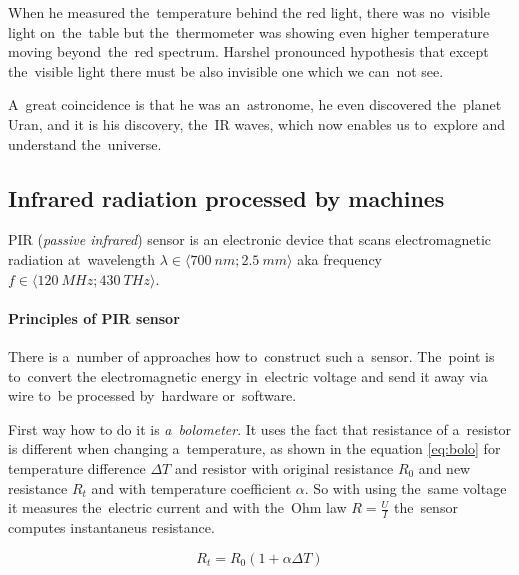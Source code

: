 When he measured the~temperature behind the red light, there was no~visible light on~the~table but
the~thermometer was showing even higher temperature moving beyond~the~red spectrum. Harshel
pronounced hypothesis that except the~visible light there must be also invisible one which we can~not
see. \cite{HerschelLife}


A~great coincidence is that he was an~astronome, he even discovered the~planet Uran, and it is his discovery,
the~IR waves, which now enables us to~explore and understand the~universe. \cite{NasaIrVideo}



\subsection*{Infrared radiation processed by machines}
\label{IRsensing}
PIR ({\it passive infrared}) sensor is an electronic device that scans electromagnetic
radiation at~wavelength $\lambda\in \langle 700~nm;2.5~mm \rangle$ aka frequency $f\in \langle 120~MHz;430~THz \rangle$. \cite{an2105}

\paragraph{Principles of PIR sensor}
There is a~number of approaches how to~construct such a~sensor. The~point is to~convert the electromagnetic
energy in~electric voltage and send it away via wire to~be processed by~hardware or~software.

First way how to do it is {\it a~bolometer}. It uses the fact that resistance of a~resistor is different
when changing a~temperature, as shown in the equation \ref{eq:bolo} for temperature difference $\Delta T$
and resistor with original resistance $R_0$ and new resistance $R_t$ and with temperature coefficient $\alpha$.
So with using the~same voltage it measures the~electric current and with the~Ohm law $R = \frac{U}{I}$
the~sensor computes instantaneus resistance.

\begin{equation}
\label{eq:bolo}
R_t = R_0 (1 + \alpha\Delta T)
\end{equation}

